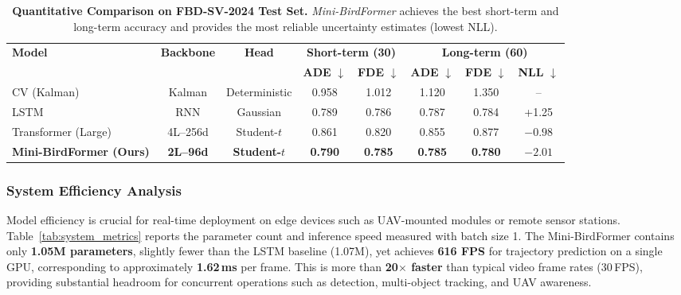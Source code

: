 \documentclass[journal]{IEEEtran}
\begin{document}
\begin{table}[t]
	\centering
	\caption{\textbf{Quantitative Comparison on FBD-SV-2024 Test Set.} \textit{Mini-BirdFormer} achieves the best short-term and long-term accuracy and provides the most reliable uncertainty estimates (lowest NLL).}
	\label{tab:main_results}
	\setlength{\tabcolsep}{7pt}
	\renewcommand{\arraystretch}{1.1}
	\begin{tabular}{l|c|c|cc|ccc}
		\toprule
		\multirow{2}{*}{\textbf{Model}} &
		\multirow{2}{*}{\textbf{Backbone}} &
		\multirow{2}{*}{\textbf{Head}} &
		\multicolumn{2}{c|}{\textbf{Short-term (30)}} &
		\multicolumn{3}{c}{\textbf{Long-term (60)}} \\
		\cline{4-8}
		& & & \textbf{ADE} $\downarrow$ & \textbf{FDE} $\downarrow$ &
		\textbf{ADE} $\downarrow$ & \textbf{FDE} $\downarrow$ & \textbf{NLL} $\downarrow$ \\
		\midrule
		CV (Kalman) & Kalman & Deterministic & 0.958 & 1.012 & 1.120 & 1.350 & -- \\
		LSTM~\cite{Alahi2016SocialLSTM} & RNN & Gaussian & 0.789 & 0.786 & 0.787 & 0.784 & +1.25 \\
		Transformer (Large)~\cite{Giuliari2021Transformer} & 4L--256d & Student-$t$ & 0.861 & 0.820 & 0.855 & 0.877 & $-0.98$ \\
		\midrule
		\rowcolor{gray!10}
		\textbf{Mini-BirdFormer (Ours)} & \textbf{2L--96d} & \textbf{Student-$t$} &
		\textbf{0.790} & \textbf{0.785} & \textbf{0.785} & \textbf{0.780} & \textbf{$-2.01$} \\
		\bottomrule
	\end{tabular}
\end{table}

\subsubsection{System Efficiency Analysis}

Model efficiency is crucial for real-time deployment on edge devices such as UAV-mounted modules or remote sensor stations. Table~\ref{tab:system_metrics} reports the parameter count and inference speed measured with batch size 1. The Mini-BirdFormer contains only \textbf{1.05M parameters}, slightly fewer than the LSTM baseline (1.07M), yet achieves \textbf{616 FPS} for trajectory prediction on a single GPU, corresponding to approximately \textbf{1.62\,ms} per frame. This is more than \textbf{20$\times$ faster} than typical video frame rates (30\,FPS), providing substantial headroom for concurrent operations such as detection, multi-object tracking, and UAV awareness.
\end{document}
